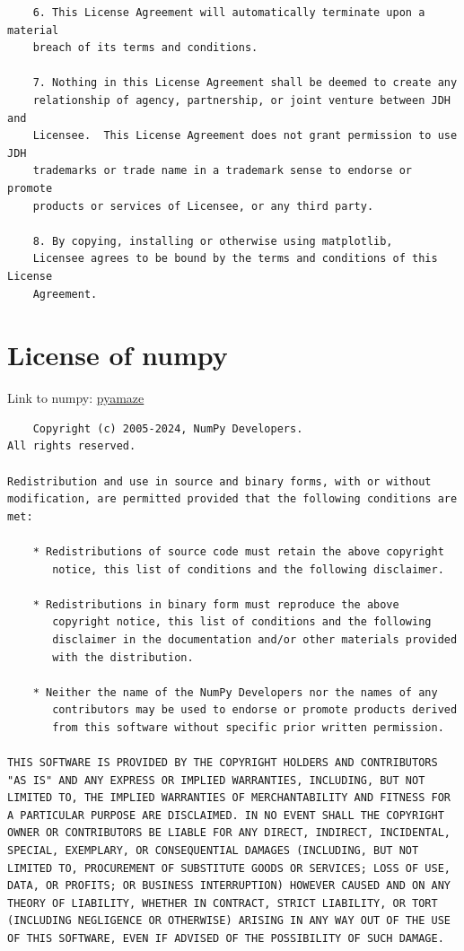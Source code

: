 \documentclass{article}
\begin{document}
\begin{verbatim}
    6. This License Agreement will automatically terminate upon a material
    breach of its terms and conditions.
    
    7. Nothing in this License Agreement shall be deemed to create any
    relationship of agency, partnership, or joint venture between JDH and
    Licensee.  This License Agreement does not grant permission to use JDH
    trademarks or trade name in a trademark sense to endorse or promote
    products or services of Licensee, or any third party.
    
    8. By copying, installing or otherwise using matplotlib,
    Licensee agrees to be bound by the terms and conditions of this License
    Agreement.
\end{verbatim}
\section{License of numpy}
Link to numpy: \href{https://github.com/MAN1986/pyamaze}{pyamaze}
\begin{verbatim}
    Copyright (c) 2005-2024, NumPy Developers.
All rights reserved.

Redistribution and use in source and binary forms, with or without
modification, are permitted provided that the following conditions are
met:

    * Redistributions of source code must retain the above copyright
       notice, this list of conditions and the following disclaimer.

    * Redistributions in binary form must reproduce the above
       copyright notice, this list of conditions and the following
       disclaimer in the documentation and/or other materials provided
       with the distribution.

    * Neither the name of the NumPy Developers nor the names of any
       contributors may be used to endorse or promote products derived
       from this software without specific prior written permission.

THIS SOFTWARE IS PROVIDED BY THE COPYRIGHT HOLDERS AND CONTRIBUTORS
"AS IS" AND ANY EXPRESS OR IMPLIED WARRANTIES, INCLUDING, BUT NOT
LIMITED TO, THE IMPLIED WARRANTIES OF MERCHANTABILITY AND FITNESS FOR
A PARTICULAR PURPOSE ARE DISCLAIMED. IN NO EVENT SHALL THE COPYRIGHT
OWNER OR CONTRIBUTORS BE LIABLE FOR ANY DIRECT, INDIRECT, INCIDENTAL,
SPECIAL, EXEMPLARY, OR CONSEQUENTIAL DAMAGES (INCLUDING, BUT NOT
LIMITED TO, PROCUREMENT OF SUBSTITUTE GOODS OR SERVICES; LOSS OF USE,
DATA, OR PROFITS; OR BUSINESS INTERRUPTION) HOWEVER CAUSED AND ON ANY
THEORY OF LIABILITY, WHETHER IN CONTRACT, STRICT LIABILITY, OR TORT
(INCLUDING NEGLIGENCE OR OTHERWISE) ARISING IN ANY WAY OUT OF THE USE
OF THIS SOFTWARE, EVEN IF ADVISED OF THE POSSIBILITY OF SUCH DAMAGE.
\end{verbatim}
\end{document}
